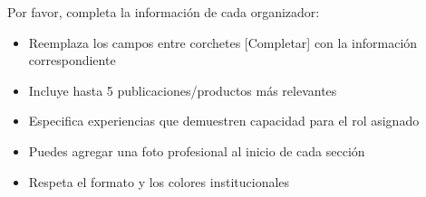 \documentclass[12pt,a4paper]{article}
\begin{document}
Por favor, completa la información de cada organizador:

\begin{tcolorbox}[cajainfo, title=Instrucciones]
\begin{itemize}[label={\textcolor{verdemid}{\textbullet}}]
  \item Reemplaza los campos entre corchetes [Completar] con la información correspondiente
  \item Incluye hasta 5 publicaciones/productos más relevantes
  \item Especifica experiencias que demuestren capacidad para el rol asignado
  \item Puedes agregar una foto profesional al inicio de cada sección
  \item Respeta el formato y los colores institucionales
\end{itemize}
\end{tcolorbox}
\end{document}
